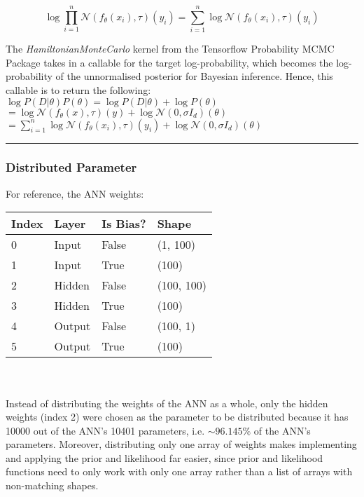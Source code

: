 \documentclass[conference]{IEEEtran}
\begin{document}
\begin{equation*}
	\log \prod_{i=1}^n \mathcal{N}(f_\theta(x_i), \tau)(y_i) = \sum_{i=1}^n \log \mathcal{N}(f_\theta(x_i), \tau)(y_i)
\end{equation*}

The \textit{HamiltonianMonteCarlo} kernel from the Tensorflow Probability MCMC Package takes in a callable for the target log-probability, which becomes the log-probability of the unnormalised posterior for Bayesian inference. Hence, this callable is to return the following:\\

$\log P(D|\theta)P(\theta) = \log P(D|\theta) + \log P(\theta)$ \\

$= \log \mathcal{N}(f_\theta(x), \tau)(y) + \log \mathcal{N}(0, \sigma I_d)(\theta)$ \\

$\displaystyle = \sum_{i=1}^n \log \mathcal{N}(f_\theta(x_i), \tau)(y_i) + \log \mathcal{N}(0, \sigma I_d)(\theta)$ \\

\par\noindent\rule{0.49\textwidth}{0.1pt}

\subsubsection{Distributed Parameter}
For reference, the ANN weights:\\

\begin{tabular}{| m{1.5cm} | m{1.5cm} | m{1.5cm} | m{1.5cm} |}
    \hline
    \textbf{Index} & \textbf{Layer} & \textbf{Is Bias?}& \textbf{Shape} \\
    \hline
    0 & Input & False & (1, 100) \\
    \hline
    1 & Input & True & (100) \\
    \hline
    2 & Hidden & False & (100, 100) \\
    \hline
    3 & Hidden & True & (100) \\
    \hline
    4 & Output & False & (100, 1) \\
    \hline
    5 & Output & True & (100) \\
    \hline
\end{tabular} \\~\\

Instead of distributing the weights of the ANN as a whole, only the hidden weights (index 2) were chosen as the parameter to be distributed because it has 10000 out of the ANN's 10401 parameters, i.e. $\sim 96.145\%$ of the ANN's parameters. Moreover, distributing only one array of weights makes implementing and applying the prior and likelihood far easier, since prior and likelihood functions need to only work with only one array rather than a list of arrays with non-matching shapes.\\
\end{document}
